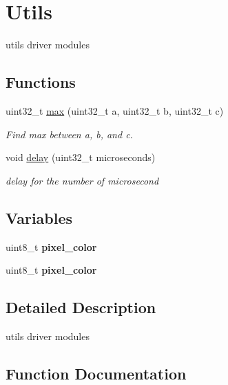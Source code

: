 \hypertarget{group___utils}{}\section{Utils}
\label{group___utils}


utils driver modules  


\subsection*{Functions}
\begin{DoxyCompactItemize}
\item 
uint32\+\_\+t \hyperlink{group___utils_gafa33c555a40e71b0cc32aa3731f6fabe}{max} (uint32\+\_\+t a, uint32\+\_\+t b, uint32\+\_\+t c)
\begin{DoxyCompactList}\small\item\em Find max between a, b, and c. \end{DoxyCompactList}\item 
void \hyperlink{group___utils_gaf1a8629740f19d111a55636a19c2bf08}{delay} (uint32\+\_\+t microseconds)
\begin{DoxyCompactList}\small\item\em delay for the number of microsecond \end{DoxyCompactList}\end{DoxyCompactItemize}
\subsection*{Variables}
\begin{DoxyCompactItemize}
\item 
\mbox{\label{group___utils_ga91a0f4b54880f52e0b02f7aeb96ca304}} 
uint8\+\_\+t {\bfseries pixel\+\_\+color}
\item 
\mbox{\label{group___utils_ga91a0f4b54880f52e0b02f7aeb96ca304}} 
uint8\+\_\+t {\bfseries pixel\+\_\+color}
\end{DoxyCompactItemize}


\subsection{Detailed Description}
utils driver modules 



\subsection{Function Documentation}
\mbox{\label{group___utils_gaf1a8629740f19d111a55636a19c2bf08}} 
